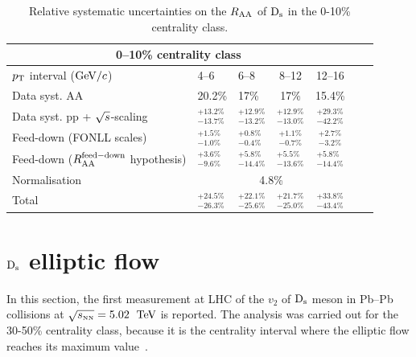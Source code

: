 \begin{table}[!h]
\centering
\begin{tabular}{|l|l|l|c|c|c|c|}
\hline
\multicolumn{5}{|c|}{0--10\% centrality class}       \\                                                                                                                                                                                                                                               \hline
$p_{\rm T}$ interval ($\mathrm{GeV}/c$)         &    4--6          & 6--8      &   8--12            & 12--16                  \\ 
\hline
Data syst. AA          & 20.2\%& 17\%& 17\%& 15.4\%\\
Data syst. pp + $\sqrt{s}$-scaling     & $^{+13.2\%}_{-13.7\%}$  &$^{+12.9\%}_{-13.2\%}$ &$^{+12.9\%}_{-13.0\%} $ &$^{+29.3\%}_{-42.2\%}$  \\
Feed-down (FONLL scales)    &  $^{+1.5\%}_{-1.0\%}$& $^{+0.8\%}_{-0.4\%}$&  $^{+1.1\%}_{-0.7\%}$&  $^{+2.7\%}_{-3.2\%}$\\
Feed-down ($R_{\rm AA}^{\rm feed-down}$ hypothesis)          & $^{+3.6\%}_{-9.6\%}$& $^{+5.8\%}_{-14.4\%}$& $^{+5.5\%}_{-13.6\%}$& $^{+5.8\%}_{-14.4\%}$\\
\hline
Normalisation     & \multicolumn{4}{|c|}{4.8\%} \\
\hline
\hline
Total  & $^{+24.5\%}_{-26.3\%}$& $^{+22.1\%}_{-25.6\%}$& $^{+21.7\%}_{-25.0\%}$&$^{+33.8\%}_{-43.4\%}$\\
\hline
\end{tabular}
\caption{Relative systematic uncertainties on the $R_{\rm AA}$ of ${\rm D_s}$ in the 0-10\% centrality class.}
\label{tab:sysunc_yieldtable}
\end{table}

\section{${\rm D_s}$ elliptic flow}
In this section, the first measurement at LHC of the $v_2$ of 
${\rm D_s}$ meson in Pb--Pb collisions at 
$\sqrt{s_{\rm \scriptscriptstyle NN}} = 5.02$~$\mathrm{TeV}$ is reported. The analysis was carried 
out for the 30-50\% centrality class, because it is the centrality
interval where the elliptic flow reaches its maximum value~\cite{Adam:2016izf}. 

